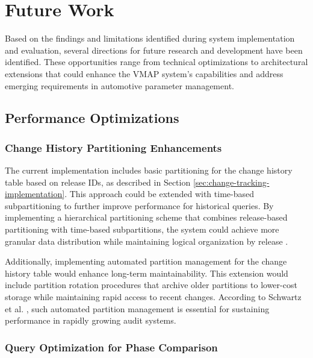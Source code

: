 \section{Future Work}
\label{sec:future-work}

Based on the findings and limitations identified during system implementation and evaluation, several directions for future research and development have been identified. These opportunities range from technical optimizations to architectural extensions that could enhance the VMAP system's capabilities and address emerging requirements in automotive parameter management.

\subsection{Performance Optimizations}
\label{subsec:performance-optimizations}

\subsubsection{Change History Partitioning Enhancements}
\label{subsubsec:change-history-partitioning}

The current implementation includes basic partitioning for the change history table based on release IDs, as described in Section \ref{sec:change-tracking-implementation}. This approach could be extended with time-based subpartitioning to further improve performance for historical queries. By implementing a hierarchical partitioning scheme that combines release-based partitioning with time-based subpartitions, the system could achieve more granular data distribution while maintaining logical organization by release \cite{obe2017postgresql}.

Additionally, implementing automated partition management for the change history table would enhance long-term maintainability. This extension would include partition rotation procedures that archive older partitions to lower-cost storage while maintaining rapid access to recent changes. According to Schwartz et al. \cite{schwartz2012high}, such automated partition management is essential for sustaining performance in rapidly growing audit systems.

\subsubsection{Query Optimization for Phase Comparison}
\label{subsubsec:query-optimization}

